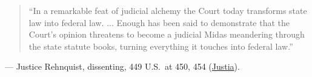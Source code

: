 \documentclass[12pt]{article}
\begin{document}
\begin{quote}
``In a remarkable feat of judicial alchemy the Court today transforms state law into federal law. ... Enough has been said to demonstrate that the Court's opinion threatens to become a judicial Midas meandering through the state statute books, turning everything it touches into federal law.''
\end{quote}
\noindent --- Justice Rehnquist, dissenting, 449 U.S.\ at 450, 454 (\href{https://supreme.justia.com/cases/federal/us/449/433/}{Justia}).
\end{document}

